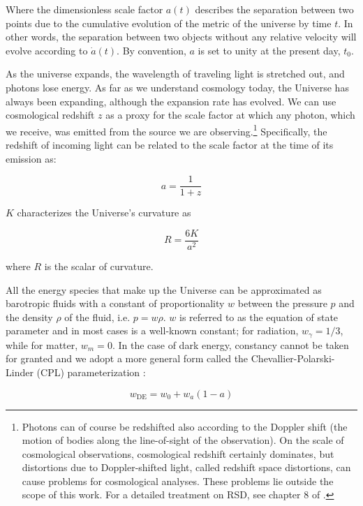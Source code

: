 Where the dimensionless scale factor $a(t)$ describes the
separation between two points due to the cumulative evolution of the metric of 
the universe by time $t$. In other words, the separation between two objects
without any relative velocity will evolve according to $\dot{a}(t)$. By 
convention, $a$ is set to unity at the present day, $t_0$.

As 
the universe expands, the wavelength of traveling light is stretched out, and
photons lose energy. As far as we understand cosmology today, the Universe has
always been expanding, although the expansion rate has evolved. We can use
cosmological redshift $z$ as a proxy for the scale factor at 
which any photon, which we receive, was emitted from the source we are 
observing.\footnote{Photons can of course be redshifted also according to the
Doppler shift (the motion of bodies along the line-of-sight of the 
observation). On the scale of cosmological observations, cosmological redshift
certainly dominates, but distortions due to Doppler-shifted light,
called redshift space distortions, can cause problems for cosmological 
analyses. These problems lie outside the scope of this work. For a detailed
treatment on RSD, see chapter 8 of .} Specifically, the redshift of
incoming light can
be related to the scale factor at the time of its emission as:

\begin{equation}
\label{eq: a_to_z}
a = \frac{1}{1 + z}
\end{equation}

$K$ characterizes the Universe's curvature as

\begin{equation}
R = \frac{6K}{a^2}
\end{equation}

where $R$ is the scalar of curvature.

All the energy species that make up the Universe can be approximated as
barotropic fluids with a constant of proportionality $w$ between the
pressure $p$ and the density $\rho$ of the fluid, i.e. $p = w \rho$. $w$ is
referred to as the equation of state parameter and in most cases is a
well-known constant; for radiation, $w_\gamma = 1/3$, while for matter,
$w_m = 0$. In
the case of dark energy, constancy cannot be taken for granted and we
adopt a more general form called the Chevallier-Polarski-Linder (CPL) 
parameterization :

\begin{equation}
w_\text{DE} = w_0 + w_a (1 - a)
\end{equation}

